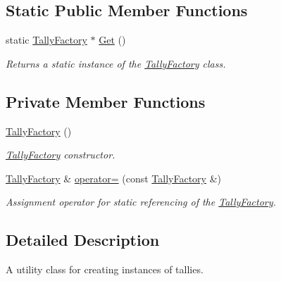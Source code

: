 \subsection*{Static Public Member Functions}
\begin{DoxyCompactItemize}
\item 
static \hyperlink{classTallyFactory}{Tally\-Factory} $\ast$ \hyperlink{classTallyFactory_a3f9230487e7fb1568524c21fa3f49360}{Get} ()
\begin{DoxyCompactList}\small\item\em Returns a static instance of the \hyperlink{classTallyFactory}{Tally\-Factory} class. \end{DoxyCompactList}\end{DoxyCompactItemize}
\subsection*{Private Member Functions}
\begin{DoxyCompactItemize}
\item 
\hypertarget{classTallyFactory_aac17a9cadbdd52583c3f70cab3ae4da8}{\hyperlink{classTallyFactory_aac17a9cadbdd52583c3f70cab3ae4da8}{Tally\-Factory} ()}\label{classTallyFactory_aac17a9cadbdd52583c3f70cab3ae4da8}

\begin{DoxyCompactList}\small\item\em \hyperlink{classTallyFactory}{Tally\-Factory} constructor. \end{DoxyCompactList}\item 
\hyperlink{classTallyFactory}{Tally\-Factory} \& \hyperlink{classTallyFactory_a5a7f7937050ad6a5155102cbb02ce94e}{operator=} (const \hyperlink{classTallyFactory}{Tally\-Factory} \&)
\begin{DoxyCompactList}\small\item\em Assignment operator for static referencing of the \hyperlink{classTallyFactory}{Tally\-Factory}. \end{DoxyCompactList}\end{DoxyCompactItemize}


\subsection{Detailed Description}
A utility class for creating instances of tallies. 

